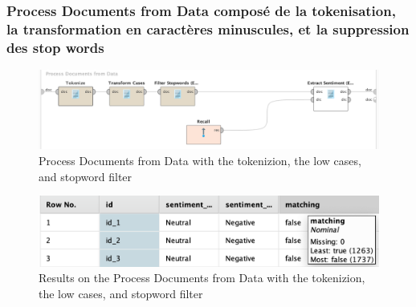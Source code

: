 \documentclass[a4paper]{article}
\begin{document}
\subsubsection{Process Documents from Data composé de la tokenisation, la transformation en caractères minuscules, et la suppression des stop words}
\begin{figure}[H]
	\includegraphics[width=\linewidth]{imgs/part_3/3_processing_documents_no_stem_filter_token}
	\caption{Process Documents from Data with the tokenizion, the low cases, and stopword filter}
	\label{fig:3_processing_documents_no_stem_filter_token}
\end{figure}
\begin{figure}[H]
	\includegraphics[width=\linewidth]{imgs/part_3/3_processing_documents_no_stem_filter_token_results}
	\caption{Results on the Process Documents from Data with the tokenizion, the low cases, and stopword filter}
	\label{fig:3_processing_documents_no_stem_filter_token_results}
\end{figure}
\end{document}
